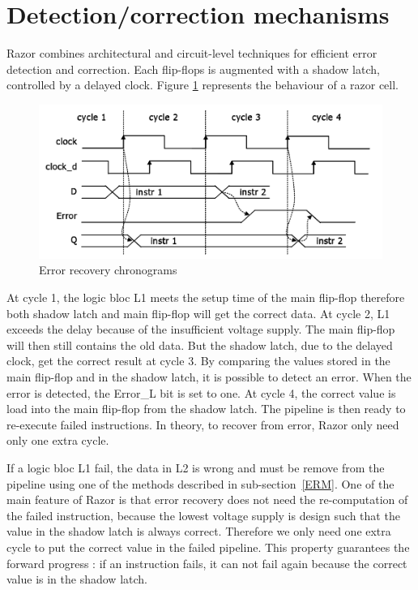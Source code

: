 \documentclass[fleqn,envcountsame,runningheads,10pt,a4paper]{llncs}
\begin{document}
\section{Detection/correction mechanisms}
Razor combines architectural and circuit-level techniques for efficient error detection and correction. Each flip-flops is augmented with a shadow latch, controlled by a delayed clock. Figure \ref{figure2} represents the behaviour of a razor cell.
\begin{figure}[!h]
    \centering
   \centerline{\includegraphics[scale=0.3]{./img/figure2.png}}
   \caption{\label{figure2}Error recovery chronograms\cite{Barthou:1998}}
\end{figure}
At cycle 1, the logic bloc L1 meets the setup time of the main flip-flop therefore both shadow latch and main flip-flop will get the correct data. At cycle 2, L1 exceeds the delay because of the insufficient voltage supply. The main flip-flop will then still contains the old data. But the shadow latch, due to the delayed clock, get the correct result at cycle 3. By comparing the values stored in the main flip-flop and in the shadow latch, it is possible to detect an error. When the error is detected, the Error\_L bit is set to one. At cycle 4, the correct value is load into the main flip-flop from the shadow latch. The pipeline is then ready to re-execute failed instructions. In theory, to recover from error, Razor only need only one extra cycle. 

If a logic bloc L1 fail, the data in L2 is wrong and must be remove from the pipeline using one of the methods described in sub-section~\ref{ERM}. One of the main feature of Razor is that error recovery does not need the re-computation of the failed instruction, because the lowest voltage supply is design such that the value in the shadow latch is always correct. Therefore we only need one extra cycle to put the correct value in the failed pipeline. This property guarantees the forward progress : if an instruction fails, it can not fail again because the correct value is in the shadow latch. 
\end{document}
